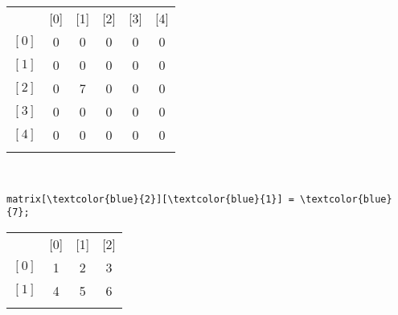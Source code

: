 \begin{itemize}
\begin{itemize}
\begin{minipage}{2.3in}
\begin{Verbatim}[commandchars=\\\{\}]
					\end{Verbatim}
		\end{minipage}
		\begin{minipage}{2.3in}
			\centering
			\begin{tabular}{c | c | c | c | c | c |}
				\multicolumn{1}{c}{\phantom{text}} & \multicolumn{1}{c}{[0]} & \multicolumn{1}{c}{[1]} & \multicolumn{1}{c}{[2]} & \multicolumn{1}{c}{[3]} & \multicolumn{1}{c}{[4]}\\\hhline{~|-----}
				$ \left[0\right] $ & \cellcolor{Arraycolor}0 & \cellcolor{Arraycolor}0 & \cellcolor{Arraycolor}0 & \cellcolor{Arraycolor}0 & \cellcolor{Arraycolor}0\\\hhline{~|-----}
				$ \left[1\right] $ & \cellcolor{Arraycolor}0 & \cellcolor{Arraycolor}0 & \cellcolor{Arraycolor}0 & \cellcolor{Arraycolor}0 & \cellcolor{Arraycolor}0\\\hhline{~|-----}
				$ \left[2\right] $ & \cellcolor{Arraycolor}0 & \cellcolor{Arraycolor}7 & \cellcolor{Arraycolor}0 & \cellcolor{Arraycolor}0 & \cellcolor{Arraycolor}0\\\hhline{~|-----}
				$ \left[3\right] $ & \cellcolor{Arraycolor}0 & \cellcolor{Arraycolor}0 & \cellcolor{Arraycolor}0 & \cellcolor{Arraycolor}0 & \cellcolor{Arraycolor}0\\\hhline{~|-----}
				$ \left[4\right] $ & \cellcolor{Arraycolor}0 & \cellcolor{Arraycolor}0 & \cellcolor{Arraycolor}0 & \cellcolor{Arraycolor}0 & \cellcolor{Arraycolor}0\\\hhline{~|-----}
			\end{tabular}\\
			\begin{Verbatim}[commandchars=\\\{\}]
        matrix[\textcolor{blue}{2}][\textcolor{blue}{1}] = \textcolor{blue}{7};
			\end{Verbatim}
		\end{minipage}
		\begin{minipage}{2.3in}
			\centering
			\begin{tabular}{c | c | c | c|}
				\multicolumn{1}{c}{\phantom{text}} & \multicolumn{1}{c}{[0]} & \multicolumn{1}{c}{[1]} & \multicolumn{1}{c}{[2]}\\\hhline{~|---}
				$ \left[0\right] $ & \cellcolor{Arraycolor}1 & \cellcolor{Arraycolor}2 & \cellcolor{Arraycolor}3\\\hhline{~|---}
				$ \left[1\right] $ & \cellcolor{Arraycolor}4 & \cellcolor{Arraycolor}5 & \cellcolor{Arraycolor}6\\\hhline{~|---}

\end{tabular}
\end{minipage}
\end{itemize}
\end{itemize}

